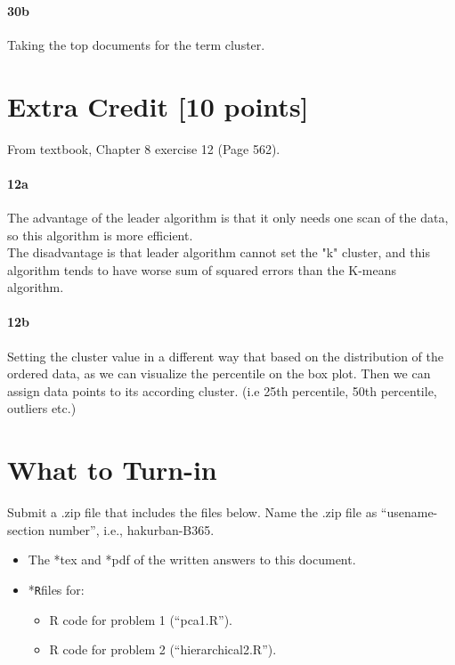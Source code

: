\documentclass{article}
\newcommand{\quotes}[1]{``#1''}
\begin{document}
\paragraph{30b}
Taking the top documents for the term cluster. 

  \section*{Extra Credit [10 points]} 

From textbook, Chapter 8 exercise 12 (Page 562).
\paragraph{12a}
The advantage of the leader algorithm is that it only needs one scan of the data, so this algorithm is more efficient.\\
The disadvantage is that leader algorithm cannot set the "k" cluster, and this algorithm tends to have worse sum of squared errors than the K-means algorithm.
\paragraph{12b}
Setting the cluster value in a different way that based on the distribution of the ordered data, as we can visualize the percentile on the box plot. Then we can assign data points to its according cluster. (i.e 25th percentile, 50th percentile, outliers etc.)\\


\section*{What to Turn-in}
 Submit a .zip file that includes the files below. Name the .zip  file as \quotes{usename-section number}, i.e., hakurban-B365.


\begin{itemize}
\item The *tex and *pdf of the written answers to this document.
\item *\texttt{R}files for:
\begin{itemize}
\item R code for problem 1 (\quotes{pca1.R}).
\item R code for problem 2 (\quotes{hierarchical2.R}).
\end{itemize}
\end{itemize}
\end{document}
